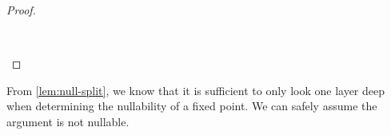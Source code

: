 \begin{proof}
\begin{code}%
%
\>[4]\AgdaSpace{}%
\AgdaSymbol{\{}\AgdaSymbol{\}}\AgdaSpace{}%
\AgdaSymbol{=}\<%
\\
\>[4][@{}l@{\AgdaIndent{0}}]%
\>[8]\AgdaSpace{}%
\AgdaSymbol{(}\AgdaSpace{}%
\AgdaSpace{}%
\AgdaSpace{}%
\AgdaSymbol{)}\AgdaSpace{}%
\AgdaSymbol{(}\AgdaSpace{}%
\AgdaSpace{}%
\AgdaSpace{}%
\AgdaSymbol{\{}\AgdaSpace{}%
\AgdaSymbol{=}\AgdaSpace{}%
\AgdaSymbol{\}}\AgdaSpace{}%
\AgdaSpace{}%
\AgdaSpace{}%
\AgdaSymbol{)}\<%
\end{code}
\end{proof}

From \cref{lem:null-split}, we know that it is sufficient to only look one layer deep when determining the nullability of a fixed point. We can safely assume the argument is not nullable. 
%
\begin{code}%
%
\>[4]\AgdaSpace{}%
\AgdaSymbol{=}\AgdaSpace{}%
\AgdaSpace{}%
\AgdaSpace{}%
\AgdaSpace{}%
\AgdaSpace{}%
\AgdaSymbol{(}\AgdaSpace{}%
\AgdaSpace{}%
\AgdaSymbol{())}\<%
\end{code}


